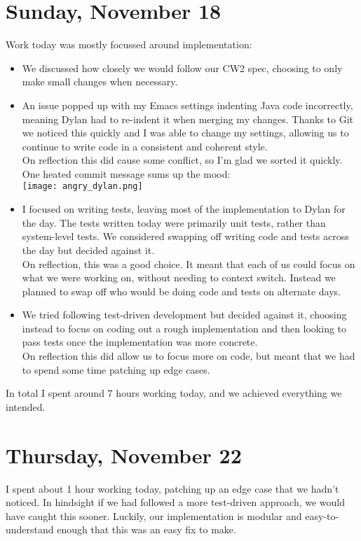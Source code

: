 \documentclass[titlepage, 12pt]{extarticle}
\begin{document}
\section{Sunday, November 18}
Work today was mostly focussed around implementation:
\begin{itemize}
\item We discussed how closely we would follow our CW2 spec, choosing to only make small changes when necessary. 
\item An issue popped up with my Emacs settings indenting Java code incorrectly, meaning Dylan had to re-indent it when merging my changes. Thanks to Git we noticed this quickly and I was able to change my settings, allowing us to continue to write code in a consistent and coherent style. \\ On reflection this did cause some conflict, so I'm glad we sorted it quickly. One heated commit message sums up the mood:\vspace{1em}\\
  \texttt{[image: angry\_dylan.png]}
\item I focused on writing tests, leaving most of the implementation to Dylan for the day. The tests written today were primarily unit tests, rather than system-level tests. We considered swapping off writing code and tests across the day but decided against it. \\ On reflection, this was a good choice. It meant that each of us could focus on what we were working on, without needing to context switch. Instead we planned to swap off who would be doing code and tests on alternate days. 
\item We tried following test-driven development but decided against it, choosing instead to focus on coding out a rough implementation and then looking to pass tests once the implementation was more concrete. \\ On reflection this did allow us to focus more on code, but meant that we had to spend some time patching up edge cases.
\end{itemize}

In total I spent around 7 hours working today, and we achieved everything we intended. 

\section{Thursday, November 22}
I spent about 1 hour working today, patching up an edge case that we hadn't noticed. In hindsight if we had followed a more test-driven approach, we would have caught this sooner. Luckily, our implementation is modular and easy-to-understand enough that this was an easy fix to make.
\end{document}
